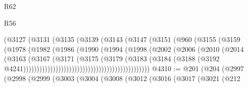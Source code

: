\begin{lexlean}{R62}
\begin{lexlean}{R56}
\begin{coremodule}
{{{{{{{{{{{{{{{{{{{{{{{{{{{{{{{{{{{{{{{{{{{{{{{{{{{{{{{{{{{{{{{{{{{{{{{{{{{{{{{{{{{{{{{{{{{{{{{{{{{{{{{{{{{{{{{{{{{{{{{{{{{{{{{{{{{{{{{{{{{{{{{{{{{{{{{{{{{{{{{{{{{{{{{{{{{{{{{{{{{{{{{{{{{{{{{{{{{{{{{{{{{{{{{{{{{                                        (@3127
                                          (@3131
                                            (@3135
                                              (@3139
                                                (@3143
                                                  (@3147
                                                    (@3151
                                                      (@960
                                                        (@3155
                                                          (@3159
                                                            (@1978
                                                              (@1982
                                                                (@1986
                                                                  (@1990
                                                                    (@1994
                                                                      (@1998
                                                                        (@2002
                                                                          (@2006
                                                                            (@2010
                                                                              (@2014
                                                                                (@3163
                                                                                  (@3167
                                                                                    (@3171
                                                                                      (@3175
                                                                                        (@3179
                                                                                          (@3183
                                                                                            (@3184
                                                                                              (@3188
                                                                                                (@3192
                                                                                                  @4241)))))))))))))))))))))))))))))))))))))))))))))))
@4310 := @201
    (@204
      (@2997
        (@2998
          (@2999
            (@3003
              (@3004
                (@3008
                  (@3012
                    (@3016
                      (@3017
                        (@3021
                          (@212
}}}}}}}}}}}}}}}}}}}}}}}}}}}}}}}}}}}}}}}}}}}}}}}}}}}}}}}}}}}}}}}}}}}}}}}}}}}}}}}}}}}}}}}}}}}}}}}}}}}}}}}}}}}}}}}}}}}}}}}}}}}}}}}}}}}}}}}}}}}}}}}}}}}}}}}}}}}}}}}}}}}}}}}}}}}}}}}}}}}}}}}}}}}}}}}}}}}}}}}}}}}}}}}}}}}
\end{coremodule}
\end{lexlean}
\end{lexlean}
